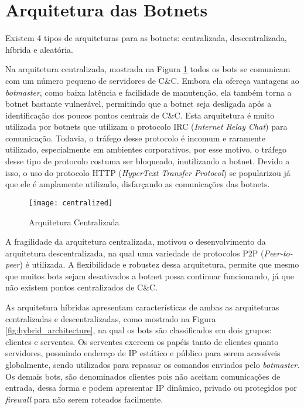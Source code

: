 \section{Arquitetura das Botnets}
Existem 4 tipos de arquiteturas para as botnets: centralizada, descentralizada, híbrida e aleatória. 

Na arquitetura centralizada, mostrada na Figura \ref{fig:centralized_architecture} todos os bots se comunicam com um número pequeno de servidores de C\&C. Embora ela ofereça vantagens ao \textit{botmaster}, como baixa latência e facilidade de manutenção, ela também torna a botnet bastante vulnerável, permitindo que a botnet seja desligada após a identificação dos poucos pontos centrais de C\&C. Esta arquitetura é muito utilizada por botnets que utilizam o protocolo IRC (\textit{Internet Relay Chat}) para comunicação. Todavia, o tráfego desse protocolo é incomum e raramente utilizado, especialmente em ambientes corporativos, por esse motivo, o tráfego desse tipo de protocolo costuma ser bloqueado, inutilizando a botnet. Devido a isso, o uso do protocolo HTTP (\textit{HyperText Transfer Protocol}) se popularizou já que ele é amplamente utilizado, disfarçando as comunicações das botnets.

\begin{figure}
\texttt{[image: centralized]}
\caption[Arquitetura Centralizada]{Arquitetura Centralizada\cite{wang2010advanced}} \label{fig:centralized_architecture}
\end{figure}

A fragilidade da arquitetura centralizada, motivou o desenvolvimento da arquitetura descentralizada, na qual uma variedade de protocolos P2P (\textit{Peer-to-peer}) é utilizada. A flexibilidade e robustez dessa arquitetura, permite que mesmo que muitos bots sejam desativados a botnet possa continuar funcionando, já que não existem pontos centralizados de C\&C. 

As arquitetura híbridas apresentam características de ambas as arquiteturas centralizadas e descentralizadas, como mostrado na Figura \ref{fig:hybrid_architecture}, na qual os bots são classificados em dois grupos: clientes e serventes. Os serventes exercem os papéis tanto de clientes quanto servidores, possuindo endereço de IP estático e público para serem acessíveis globalmente, sendo utilizados para repassar os comandos enviados pelo \textit{botmaster}. Os demais bots, são denominados clientes pois não aceitam comunicações de entrada, dessa forma e podem apresentar IP dinâmico, privado ou protegidos por \textit{firewall} para não serem roteados facilmente. 

